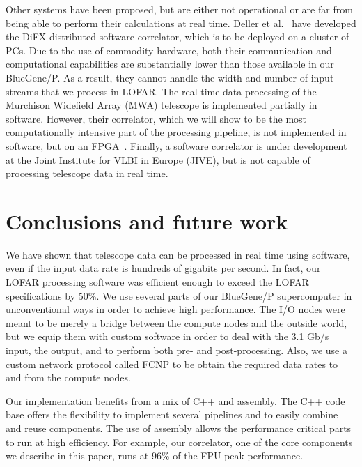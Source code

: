 \documentclass[10pt]{article}
\begin{document}
Other systems have been proposed, but are either not operational or are far from being able to perform
their calculations at real time. Deller et al.~\cite{Deller:07} have developed the DiFX distributed
software correlator, which is to be deployed on a cluster of PCs. Due to the use of commodity hardware,
both their communication and computational capabilities are substantially lower than those available in
our BlueGene/P. As a result, they cannot handle the width and number of input streams that we process
in LOFAR. The real-time data processing of the Murchison Widefield Array (MWA) telescope is implemented
partially in software. However, their correlator, which we will show to be the most computationally
intensive part of the processing pipeline, is not implemented in software, but on an FPGA~\cite{Ord:08}.
Finally, a software correlator is under development at the Joint Institute for VLBI in Europe
(JIVE), but is not capable of processing telescope data in real time.

\section{Conclusions and future work}

We have shown that telescope data can be processed in real time using software, even if the
input data rate is hundreds of gigabits per second. In fact, our LOFAR processing software was
efficient enough to exceed the LOFAR specifications by 50\%. We use several parts of our BlueGene/P
supercomputer in unconventional ways in order to achieve high performance. The I/O nodes were meant
to be merely a bridge between the compute nodes and the outside world, but we equip them
with custom software in order to deal with the 3.1 Gb/s input, the output, and to perform both
pre- and post-processing. Also, we use a custom network protocol called FCNP to be
obtain the required data rates to and from the compute nodes.

Our implementation benefits from a mix of C++ and assembly. The C++ code base offers the flexibility
to implement several pipelines and to easily combine and reuse components. The use of assembly allows
the performance critical parts to run at high efficiency. For example, our correlator, one of the core
components we describe in this paper, runs at 96\% of the FPU peak performance.

\end{document}
